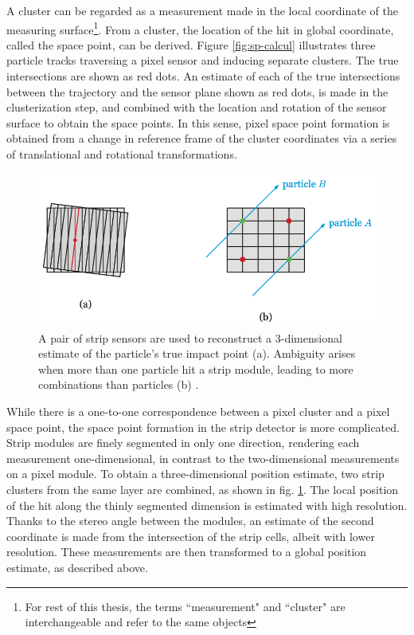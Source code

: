 A cluster can be regarded as a measurement made in the local coordinate of the measuring surface\footnote{For rest of this thesis, the terms ``measurement" and ``cluster" are interchangeable and refer to the same objects}.
From a cluster, the location of the hit in global coordinate, called the space point, can be derived.
Figure \ref{fig:sp-calcul} illustrates three particle tracks traversing a pixel sensor and inducing separate clusters. 
The true intersections are shown as red dots. 
An estimate of each of the true intersections between the trajectory and the sensor plane shown as red dots, is made in the clusterization step, and combined with the location and rotation of the sensor surface to obtain the space points.
In this sense, pixel space point formation is obtained from a change in reference frame of the cluster coordinates via a series of translational and rotational transformations. 

\begin{figure}[htb]
    \centering
    \includegraphics[width=0.8\linewidth]{figures/sp-calcul-strip.png}
    \caption{A pair of strip sensors are used to reconstruct a 3-dimensional estimate of the particle's true impact point (a). Ambiguity arises when more than one particle hit a strip module, leading to more combinations than particles (b) \cite{paul-thesis}. }
    \label{fig:sp-calcul-strip}
\end{figure}

While there is a one-to-one correspondence between a pixel cluster and a pixel space point, the space point formation in the strip detector is more complicated.
Strip modules are finely segmented in only one direction, rendering each measurement one-dimensional, in contrast to the two-dimensional measurements on a pixel module.
To obtain a three-dimensional position estimate, two strip clusters from the same layer are combined, as shown in fig. \ref{fig:sp-calcul-strip}. 
The local position of the hit along the thinly segmented dimension is estimated with high resolution.
Thanks to the stereo angle between the modules, an estimate of the second coordinate is made from the intersection of the strip cells, albeit with lower resolution. 
These measurements are then transformed to a global position estimate, as described above. 

